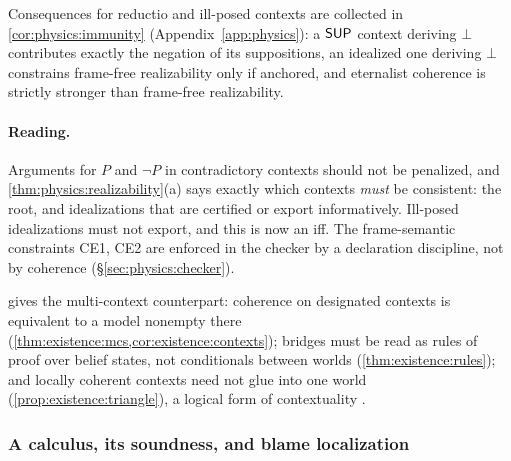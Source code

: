 Consequences for reductio and ill-posed contexts are collected in
\cref{cor:physics:immunity} (Appendix~\ref{app:physics}): a $\mathsf{SUP}$ context deriving $\bot$
contributes exactly the negation of its suppositions, an idealized one deriving $\bot$
constrains frame-free realizability only if anchored, and eternalist coherence is strictly stronger than frame-free
realizability.

\paragraph{Reading.} Arguments for $P$ and $\neg P$ in contradictory contexts should not be
penalized, and \cref{thm:physics:realizability}(a) says exactly which contexts \emph{must}
be consistent: the root, and idealizations that are certified or export informatively.
Ill-posed idealizations must not export, and this is now an iff. The frame-semantic
constraints CE1, CE2 are enforced in the checker by a declaration discipline, not by
coherence (\S\ref{sec:physics:checker}).

\begin{remark}\label{rem:physics:existence}
 gives the multi-context counterpart: coherence on designated contexts
is equivalent to a model nonempty there (\cref{thm:existence:mcs,cor:existence:contexts});
bridges must be read as rules of proof over belief states, not conditionals between worlds
(\cref{thm:existence:rules}); and locally coherent contexts need not glue into one world
(\cref{prop:existence:triangle}), a logical form of contextuality
\citep{abramsky2011sheaf}.
\end{remark}

\subsubsection{A calculus, its soundness, and blame localization}

